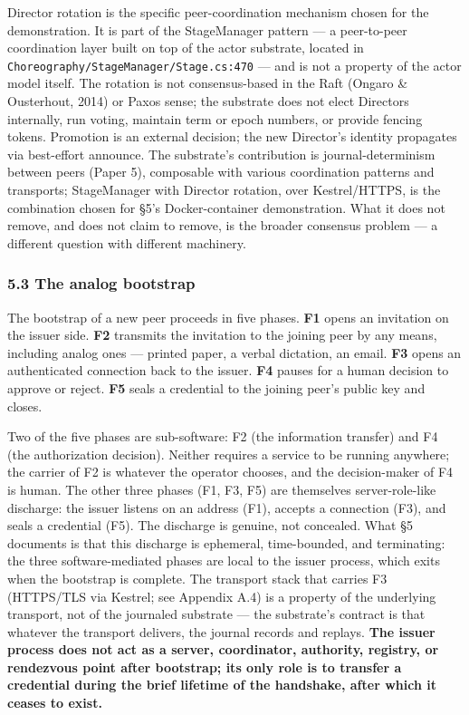\documentclass[
]{article}
\begin{document}
Director rotation is the specific peer-coordination mechanism chosen for
the demonstration. It is part of the StageManager pattern --- a
peer-to-peer coordination layer built on top of the actor substrate,
located in \texttt{Choreography/StageManager/Stage.cs:470} --- and is
not a property of the actor model itself. The rotation is not
consensus-based in the Raft (Ongaro \& Ousterhout, 2014) or Paxos sense;
the substrate does not elect Directors internally, run voting, maintain
term or epoch numbers, or provide fencing tokens. Promotion is an
external decision; the new Director's identity propagates via
best-effort announce. The substrate's contribution is
journal-determinism between peers (Paper 5), composable with various
coordination patterns and transports; StageManager with Director
rotation, over Kestrel/HTTPS, is the combination chosen for §5's
Docker-container demonstration. What it does not remove, and does not
claim to remove, is the broader consensus problem --- a different
question with different machinery.

\subsubsection{5.3 The analog bootstrap}\label{the-analog-bootstrap}

The bootstrap of a new peer proceeds in five phases. \textbf{F1} opens
an invitation on the issuer side. \textbf{F2} transmits the invitation
to the joining peer by any means, including analog ones --- printed
paper, a verbal dictation, an email. \textbf{F3} opens an authenticated
connection back to the issuer. \textbf{F4} pauses for a human decision
to approve or reject. \textbf{F5} seals a credential to the joining
peer's public key and closes.

Two of the five phases are sub-software: F2 (the information transfer)
and F4 (the authorization decision). Neither requires a service to be
running anywhere; the carrier of F2 is whatever the operator chooses,
and the decision-maker of F4 is human. The other three phases (F1, F3,
F5) are themselves server-role-like discharge: the issuer listens on an
address (F1), accepts a connection (F3), and seals a credential (F5).
The discharge is genuine, not concealed. What §5 documents is that this
discharge is ephemeral, time-bounded, and terminating: the three
software-mediated phases are local to the issuer process, which exits
when the bootstrap is complete. The transport stack that carries F3
(HTTPS/TLS via Kestrel; see Appendix A.4) is a property of the
underlying transport, not of the journaled substrate --- the substrate's
contract is that whatever the transport delivers, the journal records
and replays. \textbf{The issuer process does not act as a server,
coordinator, authority, registry, or rendezvous point after bootstrap;
its only role is to transfer a credential during the brief lifetime of
the handshake, after which it ceases to exist.}
\end{document}
